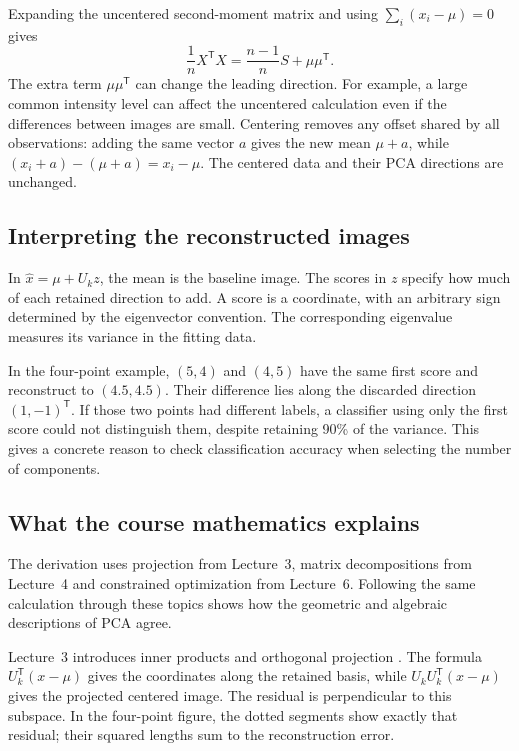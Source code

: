 \documentclass[11pt,a4paper,english]{article}
\numberwithin{equation}{section}
\newcommand{\T}{^{\mathsf T}}
\begin{document}
Expanding the uncentered second-moment matrix and using $\sum_i(x_i-\mu)=0$ gives
\begin{equation}
\frac1n X\T X=\frac{n-1}{n}S+\mu\mu\T.
\label{eq:uncentered}
\end{equation}
The extra term $\mu\mu\T$ can change the leading direction. For example, a large common intensity level can affect the uncentered calculation even if the differences between images are small. Centering removes any offset shared by all observations: adding the same vector $a$ gives the new mean $\mu+a$, while $(x_i+a)-(\mu+a)=x_i-\mu$. The centered data and their PCA directions are unchanged.

\subsection{Interpreting the reconstructed images}
In $\hat x=\mu+U_kz$, the mean is the baseline image. The scores in $z$ specify how much of each retained direction to add. A score is a coordinate, with an arbitrary sign determined by the eigenvector convention. The corresponding eigenvalue measures its variance in the fitting data.

In the four-point example, $(5,4)$ and $(4,5)$ have the same first score and reconstruct to $(4.5,4.5)$. Their difference lies along the discarded direction $(1,-1)\T$. If those two points had different labels, a classifier using only the first score could not distinguish them, despite retaining 90\% of the variance. This gives a concrete reason to check classification accuracy when selecting the number of components.

\subsection{What the course mathematics explains}
The derivation uses projection from Lecture~3, matrix decompositions from Lecture~4 and constrained optimization from Lecture~6. Following the same calculation through these topics shows how the geometric and algebraic descriptions of PCA agree.

Lecture~3 introduces inner products and orthogonal projection \cite{lecture3}. The formula $U_k\T(x-\mu)$ gives the coordinates along the retained basis, while $U_kU_k\T(x-\mu)$ gives the projected centered image. The residual is perpendicular to this subspace. In the four-point figure, the dotted segments show exactly that residual; their squared lengths sum to the reconstruction error.
\end{document}
